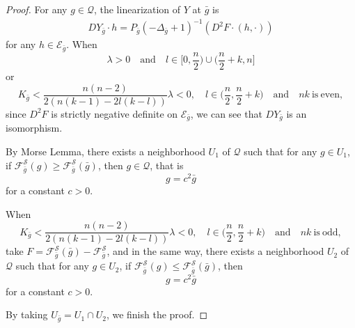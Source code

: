 \documentclass[12pt]{amsart}
\newcommand{\bg}{\bar{g}}
\numberwithin{equation}{section}
\begin{document}
\begin{proof}
    For any $g\in\mathcal{Q}$, the linearization of $Y$ at $\bg$ is 
    \begin{equation*}
    \begin{split}
        DY_{\bg}\cdot h=P_{\bg}(-\Delta_{\bg}+1)^{-1}\left(D^2F\cdot(h,\cdot)\right)
    \end{split}
    \end{equation*}
    for any $h\in\mathcal{E}_{\bg}$. When 
    $$\lambda>0 \quad \mathrm{and} \quad l\in\big[0,\frac{n}{2}\big)\cup\big(\frac{n}{2}+k,n\big]$$ or $$K_{\bg} < \frac{n(n-2)}{2\left(n(k-1)-2l(k-l)\right)}\lambda < 0,\quad l\in\big(\frac{n}{2},\frac{n}{2}+k\big)\quad \mathrm{and}\quad nk\ \mathrm{is\ even,}$$
    since $D^2F$ is strictly negative definite on $\mathcal{E}_{\bg}$, we can see that $DY_{\bg}$ is an isomorphism.

    By Morse Lemma, there exists a neighborhood $U_1$ of $\mathcal{Q}$ such that for any $g\in U_1$, if $\mathcal{F}_{\bg}^{\mathcal{S}}(g)\geq\mathcal{F}_{\bg}^{\mathcal{S}}(\bg)$, then $g\in\mathcal{Q}$, that is
    \begin{equation*}
        g=c^2\bg
    \end{equation*}
    for a constant $c>0$.

    When 
    $$K_{\bg} < \frac{n(n-2)}{2\left(n(k-1)-2l(k-l)\right)}\lambda < 0,\quad l\in\big(\frac{n}{2},\frac{n}{2}+k\big)\quad \mathrm{and}\quad nk\ \mathrm{is\ odd,}$$ 
    take $F=\mathcal{F}_{\bg}^{\mathcal{S}}(\bg)-\mathcal{F}_{\bg}^{\mathcal{S}}$, and in the same way, there exists a neighborhood $U_2$ of $\mathcal{Q}$ such that for any $g\in U_2$, if $\mathcal{F}_{\bg}^{\mathcal{S}}(g)\leq\mathcal{F}_{\bg}^{\mathcal{S}}(\bg)$, then 
    \begin{equation*}
        g=c^2\bg
    \end{equation*}
    for a constant $c>0$.

    By taking $U_{\bg}=U_1\cap U_2$, we finish the proof.
\end{proof}
\end{document}
